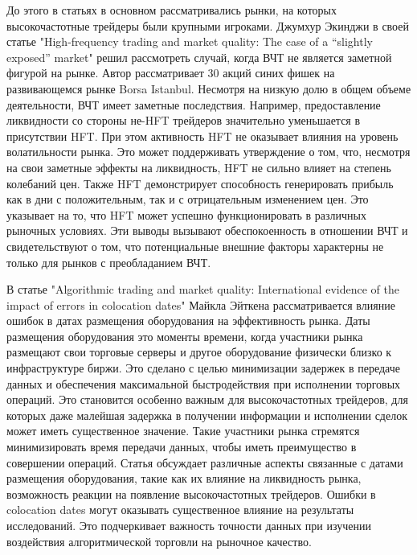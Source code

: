 \documentclass{letask}
\begin{document}
До этого в статьях в основном рассматривались рынки, на которых высокочастотные трейдеры были крупными игроками. Джумхур Экинджи в своей статье "High-frequency trading and market quality: The case of a “slightly exposed” market" решил рассмотреть случай, когда ВЧТ не является заметной фигурой на рынке. Автор рассматривает 30 акций синих фишек на развивающемся рынке Borsa Istanbul. Несмотря на низкую долю в общем объеме деятельности, ВЧТ имеет заметные последствия. Например, предоставление ликвидности со стороны не-HFT трейдеров значительно уменьшается в присутствии HFT. При этом активность HFT не оказывает влияния на уровень волатильности рынка. Это может поддерживать утверждение о том, что, несмотря на свои заметные эффекты на ликвидность, HFT не сильно влияет на степень колебаний цен. Также HFT демонстрирует способность генерировать прибыль как в дни с положительным, так и с отрицательным изменением цен. Это указывает на то, что HFT может успешно функционировать в различных рыночных условиях. Эти выводы вызывают обеспокоенность в отношении ВЧТ и свидетельствуют о том, что потенциальные внешние факторы характерны не только для рынков с преобладанием ВЧТ.

В статье "Algorithmic trading and market quality: International evidence of the impact of errors in colocation dates" Майкла Эйткена рассматривается влияние ошибок в датах размещения оборудования  на эффективность рынка. 
Даты размещения оборудования это моменты времени, когда участники рынка размещают свои торговые серверы и другое оборудование физически близко к инфраструктуре биржи. Это сделано с целью минимизации задержек в передаче данных и обеспечения максимальной быстродействия при исполнении торговых операций. Это становится особенно важным для высокочастотных трейдеров, для которых даже малейшая задержка в получении информации и исполнении сделок может иметь существенное значение. Такие участники рынка стремятся минимизировать время передачи данных, чтобы иметь преимущество в совершении операций. Статья обсуждает различные аспекты связанные с датами размещения оборудования, такие как их влияние на ликвидность рынка, возможность реакции на появление высокочастотных трейдеров. Ошибки в colocation dates могут оказывать существенное влияние на результаты исследований. Это подчеркивает важность точности данных при изучении воздействия алгоритмической торговли на рыночное качество.
\end{document}
